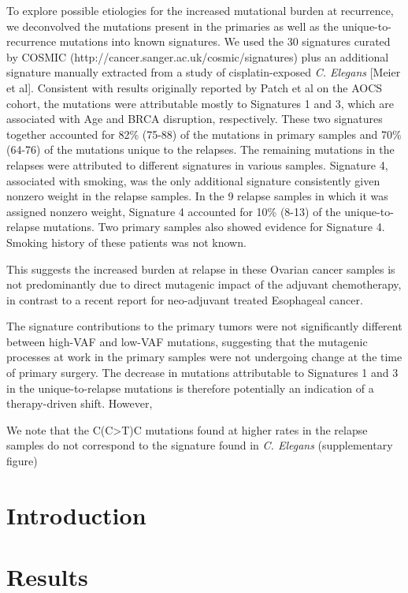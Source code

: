 To explore possible etiologies for the increased mutational burden at recurrence, we deconvolved the mutations present in the primaries as well as the unique-to-recurrence mutations into known signatures. We used the 30 signatures curated by COSMIC (http://cancer.sanger.ac.uk/cosmic/signatures) plus an additional signature manually extracted from a study of cisplatin-exposed \textit{C. Elegans} [Meier et al]. Consistent with results originally reported by Patch et al on the AOCS cohort, the mutations were attributable mostly to Signatures 1 and 3, which are associated with Age and BRCA disruption, respectively. These two signatures together accounted for 82\% (75-88) of the mutations in primary samples and 70\% (64-76) of the mutations unique to the relapses. The remaining mutations in the relapses were attributed to different signatures in various samples. Signature 4, associated with smoking, was the only additional signature consistently given nonzero weight in the relapse samples. In the 9 relapse samples in which it was assigned nonzero weight, Signature 4 accounted for 10\% (8-13) of the unique-to-relapse mutations. Two primary samples also showed evidence for Signature 4. Smoking history of these patients was not known.

This suggests the increased burden at relapse in these Ovarian cancer samples is not predominantly due to direct mutagenic impact of the adjuvant chemotherapy, in contrast to a recent report for neo-adjuvant treated Esophageal cancer.
 
The signature contributions to the primary tumors were not significantly different between high-VAF and low-VAF mutations, suggesting that the mutagenic processes at work in the primary samples were not undergoing change at the time of primary surgery. The decrease in mutations attributable to Signatures 1 and 3 in the unique-to-relapse mutations is therefore potentially an indication of a therapy-driven shift. However, 

We note that the C(C>T)C mutations found at higher rates in the relapse samples do not correspond to the signature found in \textit{C. Elegans} (supplementary figure)


\iffalse

\section*{Introduction}




\section*{Results}
